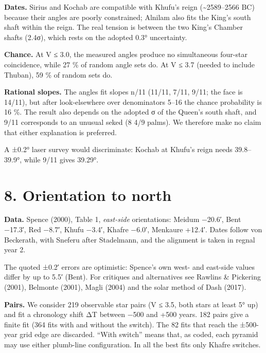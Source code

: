 \documentclass[
]{article}
\begin{document}
\textbf{Dates.} Sirius and Kochab are compatible with Khufu's reign
(\textasciitilde2589--2566 BC) because their angles are poorly
constrained; Alnilam also fits the King's south shaft within the reign.
The real tension is between the two King's Chamber shafts (2.4σ), which
rests on the adopted 0.3° uncertainty.

\textbf{Chance.} At V ≤ 3.0, the measured angles produce no simultaneous
four-star coincidence, while 27 \% of random angle sets do. At V ≤ 3.7
(needed to include Thuban), 59 \% of random sets do.

\textbf{Rational slopes.} The angles fit slopes n/11 (11/11, 7/11, 9/11;
the face is 14/11), but after look-elsewhere over denominators 5--16 the
chance probability is 16 \%. The result also depends on the adopted σ of
the Queen's south shaft, and 9/11 corresponds to an unusual seked (8 4/9
palms). We therefore make no claim that either explanation is preferred.

A ±0.2° laser survey would discriminate: Kochab at Khufu's reign needs
39.8--39.9°, while 9/11 gives 39.29°.

\hypertarget{orientation-to-north}{%
\section{8. Orientation to north}\label{orientation-to-north}}

\textbf{Data.} Spence (2000), Table 1, \emph{east-side} orientations:
Meidum −20.6′, Bent −17.3′, Red −8.7′, Khufu −3.4′, Khafre −6.0′,
Menkaure +12.4′. Dates follow von Beckerath, with Sneferu after
Stadelmann, and the alignment is taken in regnal year 2.

The quoted ±0.2′ errors are optimistic: Spence's own west- and east-side
values differ by up to 5.5′ (Bent). For critiques and alternatives see
Rawlins \& Pickering (2001), Belmonte (2001), Magli (2004) and the solar
method of Dash (2017).

\textbf{Pairs.} We consider 219 observable star pairs (V ≤ 3.5, both
stars at least 5° up) and fit a chronology shift ΔT between −500 and
+500 years. 182 pairs give a finite fit (364 fits with and without the
switch). The 82 fits that reach the ±500-year grid edge are discarded.
``With switch'' means that, as coded, each pyramid may use either
plumb-line configuration. In all the best fits only Khafre switches.
\end{document}
